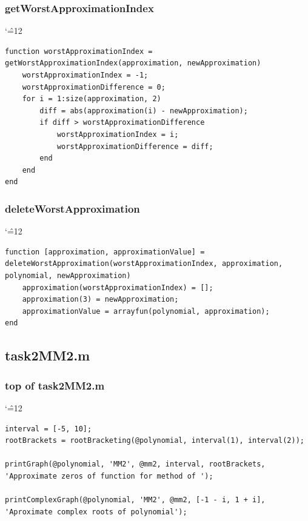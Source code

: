 \documentclass[12pt]{report}
\newenvironment{simplechar}{%
   \catcode`\^=12
}{}
\begin{document}
\subsubsection{getWorstApproximationIndex}
\begin{simplechar}
\begin{lstlisting}
function worstApproximationIndex = getWorstApproximationIndex(approximation, newApproximation)
    worstApproximationIndex = -1;
    worstApproximationDifference = 0;
    for i = 1:size(approximation, 2)
        diff = abs(approximation(i) - newApproximation);
        if diff > worstApproximationDifference
            worstApproximationIndex = i;
            worstApproximationDifference = diff;
        end
    end
end
\end{lstlisting}
\end{simplechar}

\subsubsection{deleteWorstApproximation}
\begin{simplechar}
\begin{lstlisting}
function [approximation, approximationValue] = deleteWorstApproximation(worstApproximationIndex, approximation, polynomial, newApproximation)
    approximation(worstApproximationIndex) = [];
    approximation(3) = newApproximation;
    approximationValue = arrayfun(polynomial, approximation);
end
\end{lstlisting}
\end{simplechar}

\newpage
\subsection{task2MM2.m}


\subsubsection{top of task2MM2.m}
\begin{simplechar}
\begin{lstlisting}
interval = [-5, 10];
rootBrackets = rootBracketing(@polynomial, interval(1), interval(2));

printGraph(@polynomial, 'MM2', @mm2, interval, rootBrackets, 'Approximate zeros of function for method of ');

printComplexGraph(@polynomial, 'MM2', @mm2, [-1 - i, 1 + i], 'Aproximate complex roots of polynomial');
\end{lstlisting}
\end{simplechar}
\end{document}
